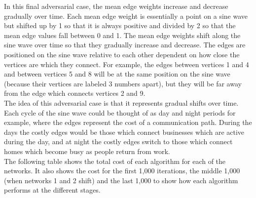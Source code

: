In this final adversarial case, the mean edge weights increase and decrease gradually over time. Each mean edge weight is essentially a point on a sine wave but shifted up by 1 so that it is always positive and divided by 2 so that the mean edge values fall between 0 and 1. The mean edge weights shift along the sine wave over time so that they gradually increase and decrease. The edges are positioned on the sine wave relative to each other dependent on how close the vertices are which they connect. For example, the edges between vertices 1 and 4 and between vertices 5 and 8 will be at the same position on the sine wave (because their vertices are labeled 3 numbers apart), but they will be far away from the edge which connects vertices 2 and 9.\\

The idea of this adversarial case is that it represents gradual shifts over time. Each cycle of the sine wave could be thought of as day and night periods for example, where the edges represent the cost of a communication path. During the days the costly edges would be those which connect businesses which are active during the day, and at night the costly edges switch to those which connect homes which become busy as people return from work.\\

The following table shows the total cost of each algorithm for each of the networks. It also shows the cost for the first 1,000 iterations, the middle 1,000 (when networks 1 and 2 shift) and the last 1,000 to show how each algorithm performs at the different stages.\\

